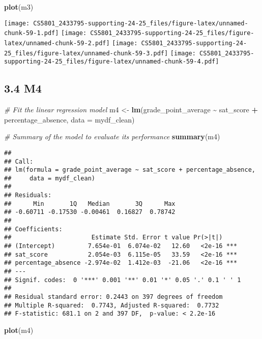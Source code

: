 \documentclass[
]{article}
\newenvironment{Shaded}{\begin{snugshade}}{\end{snugshade}}
\newcommand{\AttributeTok}[1]{\textcolor[rgb]{0.13,0.29,0.53}{#1}}
\newcommand{\CommentTok}[1]{\textcolor[rgb]{0.56,0.35,0.01}{\textit{#1}}}
\newcommand{\FunctionTok}[1]{\textcolor[rgb]{0.13,0.29,0.53}{\textbf{#1}}}
\newcommand{\NormalTok}[1]{#1}
\newcommand{\OtherTok}[1]{\textcolor[rgb]{0.56,0.35,0.01}{#1}}
\newcommand{\SpecialCharTok}[1]{\textcolor[rgb]{0.81,0.36,0.00}{\textbf{#1}}}
\begin{document}
\begin{Shaded}
\begin{Highlighting}[]
\FunctionTok{plot}\NormalTok{(m3)}
\end{Highlighting}
\end{Shaded}

\texttt{[image: CS5801\_2433795-supporting-24-25\_files/figure-latex/unnamed-chunk-59-1.pdf]}
\texttt{[image: CS5801\_2433795-supporting-24-25\_files/figure-latex/unnamed-chunk-59-2.pdf]}
\texttt{[image: CS5801\_2433795-supporting-24-25\_files/figure-latex/unnamed-chunk-59-3.pdf]}
\texttt{[image: CS5801\_2433795-supporting-24-25\_files/figure-latex/unnamed-chunk-59-4.pdf]}

\subsection{3.4 M4}\label{m4}

\begin{Shaded}
\begin{Highlighting}[]
\CommentTok{\# Fit the linear regression model}
\NormalTok{m4 }\OtherTok{\textless{}{-}} \FunctionTok{lm}\NormalTok{(grade\_point\_average }\SpecialCharTok{\textasciitilde{}}\NormalTok{ sat\_score }\SpecialCharTok{+}\NormalTok{ percentage\_absence, }\AttributeTok{data =}\NormalTok{ mydf\_clean)}

\CommentTok{\# Summary of the model to evaluate its performance}
\FunctionTok{summary}\NormalTok{(m4)}
\end{Highlighting}
\end{Shaded}

\begin{verbatim}
## 
## Call:
## lm(formula = grade_point_average ~ sat_score + percentage_absence, 
##     data = mydf_clean)
## 
## Residuals:
##      Min       1Q   Median       3Q      Max 
## -0.60711 -0.17530 -0.00461  0.16827  0.78742 
## 
## Coefficients:
##                      Estimate Std. Error t value Pr(>|t|)    
## (Intercept)         7.654e-01  6.074e-02   12.60   <2e-16 ***
## sat_score           2.054e-03  6.115e-05   33.59   <2e-16 ***
## percentage_absence -2.974e-02  1.412e-03  -21.06   <2e-16 ***
## ---
## Signif. codes:  0 '***' 0.001 '**' 0.01 '*' 0.05 '.' 0.1 ' ' 1
## 
## Residual standard error: 0.2443 on 397 degrees of freedom
## Multiple R-squared:  0.7743, Adjusted R-squared:  0.7732 
## F-statistic: 681.1 on 2 and 397 DF,  p-value: < 2.2e-16
\end{verbatim}

\begin{Shaded}
\begin{Highlighting}[]
\FunctionTok{plot}\NormalTok{(m4)}
\end{Highlighting}
\end{Shaded}
\end{document}

